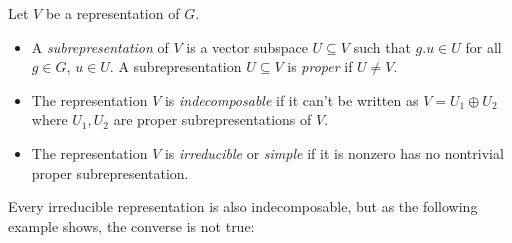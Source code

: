 \begin{definition}
    Let $V$ be a representation of $G$.
    \begin{itemize}
      \item
        A \emph{subrepresentation} of $V$ is a vector subspace $U \subseteq V$ such that $g.u \in U$ for all $g \in G$, $u \in U$.
        A subrepresentation $U \subseteq V$ is \emph{proper} if $U \neq V$.
      \item
        The representation $V$ is \emph{indecomposable} if it can’t be written as $V = U_1 \oplus U_2$ where $U_1, U_2$ are proper subrepresentations of $V$.
      \item
        The representation $V$ is \emph{irreducible} or \emph{simple} if it is nonzero has no nontrivial proper subrepresentation.
    \end{itemize}
\end{definition}

\begin{fluff}
  Every irreducible representation is also indecomposable, but as the following example shows, the converse is not true:
\end{fluff}

